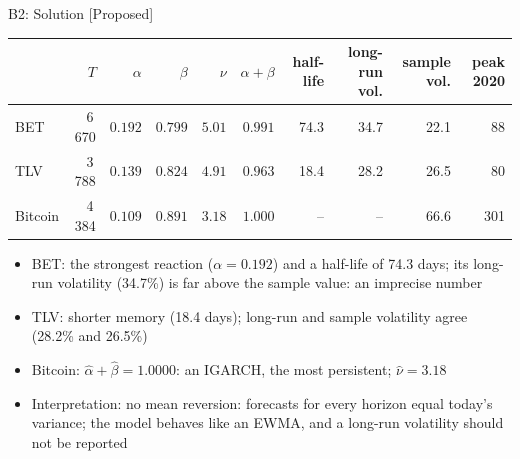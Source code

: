 \ifsolutions
\begin{frame}{B2: Solution [Proposed]}
\itemsize{\footnotesize}
\begin{center}
\scriptsize
\begin{tabular}{lrrrrrrrrr}
\toprule
& $T$ & $\alpha$ & $\beta$ & $\nu$ & $\alpha + \beta$ & half-life & long-run vol. & sample vol. & peak 2020 \\
\midrule
BET & 6\,670 & $0.192$ & $0.799$ & $5.01$ & $0.991$ & 74.3 & 34.7 & 22.1 & 88 \\
TLV & 3\,788 & $0.139$ & $0.824$ & $4.91$ & $0.963$ & 18.4 & 28.2 & 26.5 & 80 \\
Bitcoin & 4\,384 & $0.109$ & $0.891$ & $3.18$ & $1.000$ & -- & -- & 66.6 & 301 \\
\bottomrule
\end{tabular}
\end{center}
\begin{itemize}
    \item BET: the strongest reaction ($\alpha = 0.192$) and a half-life of 74.3 days; its long-run volatility (34.7\%) is far above the sample value: an imprecise number
    \item TLV: shorter memory (18.4 days); long-run and sample volatility agree (28.2\% and 26.5\%)
    \item Bitcoin: $\hat\alpha + \hat\beta = 1.0000$: an IGARCH, the most persistent; $\hat\nu = 3.18$
    \item Interpretation: no mean reversion: forecasts for every horizon equal today's variance; the model behaves like an EWMA, and a long-run volatility should not be reported
\end{itemize}
\end{frame}
\fi

